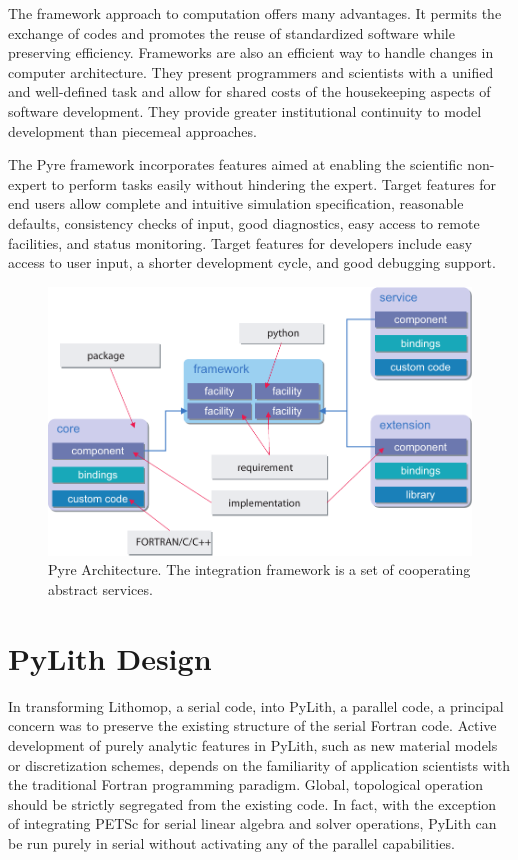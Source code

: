 The framework approach to computation offers many advantages. It
permits the exchange of codes and promotes the reuse of standardized
software while preserving efficiency. Frameworks are also an efficient
way to handle changes in computer architecture. They present
programmers and scientists with a unified and well-defined task and
allow for shared costs of the housekeeping aspects of software
development. They provide greater institutional continuity to model
development than piecemeal approaches.


The Pyre framework incorporates features aimed at enabling the
scientific non-expert to perform tasks easily without hindering the
expert. Target features for end users allow complete and intuitive
simulation specification, reasonable defaults, consistency checks of
input, good diagnostics, easy access to remote facilities, and status
monitoring. Target features for developers include easy access to user
input, a shorter development cycle, and good debugging support.

\begin{figure}[htbp]
  \begin{center}
    \includegraphics[scale=0.75]{figs/pyre_overview}
    \caption{Pyre Architecture. The integration framework is a set of
      cooperating abstract services.}
  \end{center}
\end{figure}

\section{PyLith Design}

In transforming Lithomop, a serial code, into PyLith, a parallel code,
a principal concern was to preserve the existing structure of the
serial Fortran code. Active development of purely analytic features in
PyLith, such as new material models or discretization schemes, depends
on the familiarity of application scientists with the traditional
Fortran programming paradigm. Global, topological operation should be
strictly segregated from the existing code. In fact, with the
exception of integrating PETSc for serial linear algebra and solver
operations, PyLith can be run purely in serial without activating any
of the parallel capabilities.

